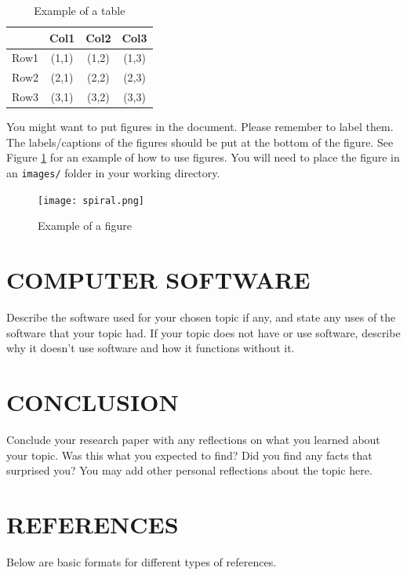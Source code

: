 \documentclass[letterpaper, 10 pt, conference]{IEEEconf}
\begin{document}
\begin{table}[h!]
\begin{center}
\begin{tabular}{||c | c | c | c||} 
\hline
  & Col1 & Col2 & Col3 \\ [0.5ex]
\hline\hline
Row1 & (1,1) & (1,2) & (1,3) \\ 
\hline
Row2 & (2,1) & (2,2) & (2,3) \\
\hline
Row3 & (3,1) & (3,2) & (3,3) \\
\hline
\end{tabular}
\caption{Example of a table}
\label{tbl:example}
\end{center}
\end{table}

You might want to put figures in the document. Please
remember to label them. The labels/captions of the figures
should be put at the bottom of the figure. See Figure
\ref{fig:example} for an example of how to use figures.
You will need to place the figure in an \texttt{images/} folder
in your working directory.

\begin{figure}[h!]
\centering
\texttt{[image: spiral.png]}
\caption{Example of a figure}
\label{fig:example}
\end{figure} 

\section{COMPUTER SOFTWARE}

Describe the software used for your chosen topic if any,
and state any uses of the software that your topic had.
If your topic does not have or use software, describe why it
doesn't use software and how it functions without it.

\section{CONCLUSION}

Conclude your research paper with any reflections on what you
learned about your topic. Was this what you expected to find?
Did you find any facts that surprised you? You may add other
personal reflections about the topic here.

\section*{REFERENCES}

Below are basic formats for different types of references.
\end{document}
